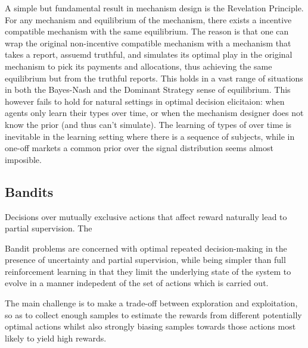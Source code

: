 A simple but fundamental result in mechanism design is the Revelation Principle.
For any mechanism and equilibrium of the mechanism, there exists a incentive compatible mechanism with the same equilibrium.
The reason is that one can wrap the original non-incentive compatible mechanism with a mechanism that takes a report, assuemd truthful, and simulates its optimal play in the original mechanism to pick its payments and allocations, thus achieving the same equilibrium but from the truthful reports. 
This holds in a vast range of situations in both the Bayes-Nash and the Dominant Strategy sense of equilibrium. 
This however fails to hold for natural settings in optimal decision elicitaion: when agents only learn their types over time, or when the mechanism designer does not know the prior (and thus can't simulate).
The learning of types of over time is inevitable in the learning setting where there is a sequence of subjects, while in one-off markets a common prior over the signal distribution seems almost imposible.



\subsection{Bandits}

Decisions over mutually exclusive actions that affect reward naturally lead to partial supervision.
The 

Bandit problems are concerned with optimal repeated decision-making in the presence of uncertainty and partial supervision, while being simpler than full reinforcement learning in that they limit the underlying state of the system to evolve in a manner indepedent of the set of actions which is carried out. 


The main challenge is to make a trade-off between exploration and exploitation, so as to collect enough samples to estimate the rewards from different potentially optimal actions whilst also strongly biasing samples towards those actions most likely to yield high rewards.

